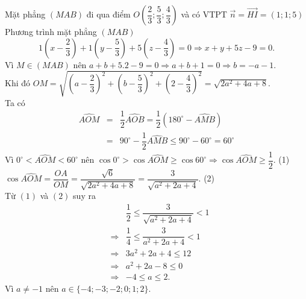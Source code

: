 \begin{bt}
{{
		} 
		Mặt phẳng $(MAB)$ đi qua điểm $O\left(\dfrac{2}{3};  \dfrac{5}{3}; \dfrac{4}{3}\right)$ và có VTPT $\overrightarrow{n} = \overrightarrow{HI} = (1;1;5)$
		Phương trình mặt phẳng  $(MAB)$
		$$1 \left( x - \dfrac{2}{3} \right) + 1 \left( y - \dfrac{5}{3} \right)  + 5 \left( z - \dfrac{4}{3} \right) = 0 \Rightarrow x + y + 5z - 9 = 0.$$
		Vì $M \in (MAB)$ nên $a  + b + 5.2 - 9 = 0 \Rightarrow a + b + 1 = 0 \Rightarrow b = -a - 1$.\\
		Khi đó $OM = \sqrt{\left( a - \dfrac{2}{3} \right)^2 + \left( b - \dfrac{5}{3} \right)^2 + \left( 2 -  \dfrac{4}{3} \right)^2 } = \sqrt{2a^2 + 4a + 8 }$.\\
		 Ta có
		\begin{eqnarray*}
			\widehat{AOM} &=& \dfrac{1}{2} \widehat{AOB} = \dfrac{1}{2} (180^\circ -  \widehat{AMB})\\
			&=& 90^\circ - \dfrac{1}{2} \widehat{AMB} \leq 90^\circ - 60^\circ  = 60^\circ
		\end{eqnarray*}
		Vì $0^\circ < \widehat{AOM} < 60^\circ$ nên $\cos 0^\circ > \cos \widehat{AOM} \geq \cos  60^\circ \Rightarrow \cos \widehat{AOM} \geq \dfrac{1}{2}$. \qquad(1)\\
		$\cos \widehat{AOM} = \dfrac{OA}{OM} = \dfrac{\sqrt{6}}{\sqrt{2a^2 +  4a + 8 }} = \dfrac{3}{\sqrt{a^2 + 2a + 4}}$. \qquad(2)\\
		Từ  $(1)$ và $(2)$ suy ra
		\begin{eqnarray*}
			& &\dfrac{1}{2} \leq \dfrac{3}{\sqrt{a^2  + 2a + 4}} < 1\\
			&\Rightarrow& \dfrac{1}{4} \leq \dfrac{3}{a^2  + 2a + 4} < 1\\
			 &\Rightarrow& 3a^2 + 2a + 4 \leq 12\\
			&\Rightarrow& a^2 + 2a  - 8 \leq 0\\
			&\Rightarrow& -4 \leq a \leq  2.
		\end{eqnarray*}
		Vì $a  \neq -1$ nên $a \in \{-4; -3; -2; 0; 1; 2\}$.
	 }
\end{bt}

